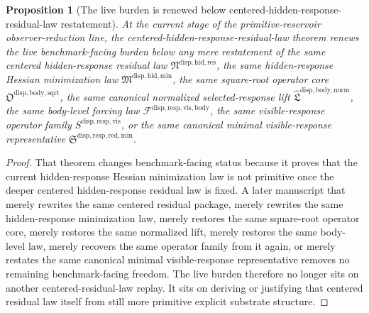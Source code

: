 \documentclass[11pt]{article}
\newcommand{\ResidualLawPackage}{\mathfrak N^{\mathrm{disp,hid,res}}}
\newcommand{\HiddenMinimizationPackage}{\mathfrak M^{\mathrm{disp,hid,min}}}
\newcommand{\SquareRootOperatorCore}{\mathfrak O^{\mathrm{disp,body,sqrt}}}
\newcommand{\NormalizedLiftPackage}{\widehat{\mathfrak L}^{\mathrm{disp,body,norm}}}
\newcommand{\VisibleBodyForcingLaw}{\mathscr F^{\mathrm{disp,resp,vis,body}}}
\newcommand{\VisibleResponseOperator}{S^{\mathrm{disp,resp,vis}}}
\newcommand{\MinimalReducedStructure}{\mathfrak S^{\mathrm{disp,resp,red,min}}}
\newtheorem{proposition}{Proposition}
\begin{document}
\begin{proposition}[The live burden is renewed below centered-hidden-response-residual-law restatement]
At the current stage of the primitive-reservoir observer-reduction line, the centered-hidden-response-residual-law theorem renews the live benchmark-facing burden below any mere restatement of the same centered hidden-response residual law \(\ResidualLawPackage\), the same hidden-response Hessian minimization law \(\HiddenMinimizationPackage\), the same square-root operator core \(\SquareRootOperatorCore\), the same canonical normalized selected-response lift \(\NormalizedLiftPackage\), the same body-level forcing law \(\VisibleBodyForcingLaw\), the same visible-response operator family \(\VisibleResponseOperator\), or the same canonical minimal visible-response representative \(\MinimalReducedStructure\).
\end{proposition}

\begin{proof}
That theorem changes benchmark-facing status because it proves that the current hidden-response Hessian minimization law is not primitive once the deeper centered hidden-response residual law is fixed. A later manuscript that merely rewrites the same centered residual package, merely rewrites the same hidden-response minimization law, merely restores the same square-root operator core, merely restores the same normalized lift, merely restores the same body-level law, merely recovers the same operator family from it again, or merely restates the same canonical minimal visible-response representative removes no remaining benchmark-facing freedom. The live burden therefore no longer sits on another centered-residual-law replay. It sits on deriving or justifying that centered residual law itself from still more primitive explicit substrate structure.
\end{proof}
\end{document}
